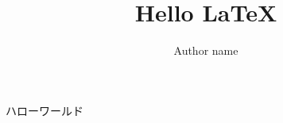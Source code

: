 \documentclass[uplatex,dvipdfmx]{jsarticle}
\title{Hello \LaTeX}
\author{Author name}
\begin{document}
\maketitle

ハローワールド
\end{document}
